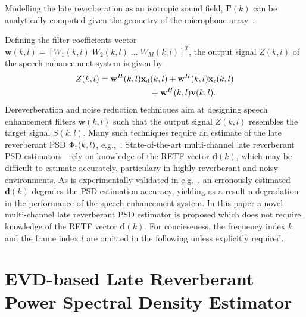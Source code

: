 \documentclass[10pt]{IEEEtran}
\begin{document}
Modelling the late reverberation as an isotropic sound field, $\boldsymbol{\Gamma}(k)$ can be analytically computed given the geometry of the microphone array~\cite{Braun_EUSIPCO_2013,Braun_EURASIP_2015,Schwartz_WASPAA_2015,Schwartz_ICASSP_2016}.

Defining the filter coefficients vector $\mathbf{w}(k,l) = [W_1(k,l) \; W_2(k,l) \; \ldots \; W_M(k,l)]^T$, the output signal $Z(k,l)$ of the speech enhancement system is given by
\begin{equation}
\begin{split}
Z(k,l) = \mathbf{w}^H(k,l)\mathbf{x}_{\rm d}&(k,l) + \mathbf{w}^H(k,l)\mathbf{x}_{\rm r}(k,l) \\
 & +  \mathbf{w}^H(k,l)\mathbf{v}(k,l).
\end{split}
\end{equation}
Dereverberation and noise reduction techniques aim at designing speech enhancement filters $\mathbf{w}(k,l)$ such that the output signal $Z(k,l)$ resembles the target signal $S(k,l)$.
Many such techniques require an estimate of the late reverberant PSD $\Phi_{\rm r}(k,l)$, e.g.,~\cite{Braun_EUSIPCO_2013,Kuklasinski_EUSIPCO_2014g,OSchwartz_ITASLP_2015}.
State-of-the-art multi-channel late reverberant PSD estimators~\cite{Braun_EUSIPCO_2013,Kuklasinski_EUSIPCO_2014g,Braun_EURASIP_2015,Schwartz_WASPAA_2015,Schwartz_ICASSP_2016,Kuklasinski_ITASLP_2016} rely on knowledge of the RETF vector $\mathbf{d}(k)$, which may be difficult to estimate accurately, particulary in highly reverberant and noisy environments. 
As is experimentally validated in e.g.~\cite{ASchwarz_ITASLP_2015,kuklasinski_AES_2016}, an erronously estimated $\mathbf{d}(k)$ degrades the PSD estimation accuracy, yielding as a result a degradation in the performance of the speech enhancement system.
In this paper a novel multi-channel late reverberant PSD estimator is proposed which does not require knowledge of the RETF vector $\mathbf{d}(k)$.
For concieseness, the frequency index $k$ and the frame index $l$ are omitted in the following unless explicitly required.

\section{EVD-based Late Reverberant \\ Power Spectral Density Estimator}
\end{document}
